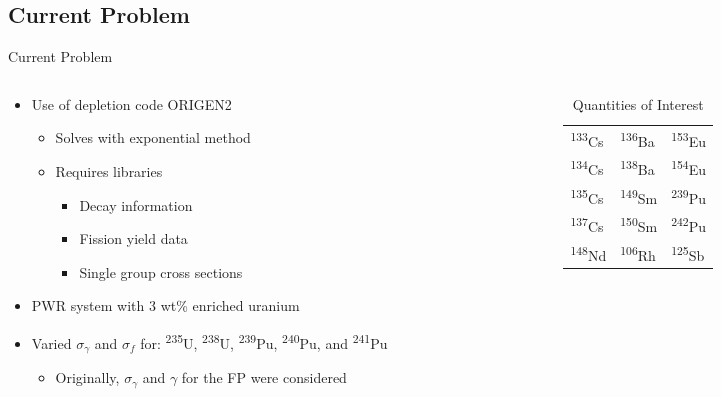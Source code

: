 \documentclass{beamer}
\newcommand{\tss}{\textsuperscript}
\begin{document}
\subsection{Current Problem}
\begin{frame}{Current Problem}
  \begin{columns}
    \begin{column}{0.6\textwidth}
      \begin{itemize}
      \item{Use of depletion code ORIGEN2}
        \begin{itemize}
        \item{Solves with exponential method}
        \item{Requires libraries}
          \begin{itemize}
          \item{Decay information}
          \item{Fission yield data}
          \item{Single group cross sections}
          \end{itemize}
        \end{itemize}
      \item{PWR system with 3 wt\% enriched uranium}
      \item{Varied $\sigma_\gamma$
        and $\sigma_f$ for: \tss{235}U, \tss{238}U,
        \tss{239}Pu, \tss{240}Pu, and \tss{241}Pu}
        \begin{itemize}
        \item{Originally, $\sigma_\gamma$ and $\gamma$ for
          the FP were considered}
        \end{itemize}
      \end{itemize}
    \end{column}
    \begin{column}{0.4\textwidth}
      \begin{table}[H]
        \begin{center}
          \caption{\large{Quantities of Interest}}
          \label{Table:1}
          \begin{tabular}{l l l}
            \toprule
            \tss{133}Cs & \tss{136}Ba & \tss{153}Eu\\
            \tss{134}Cs & \tss{138}Ba & \tss{154}Eu\\
            \tss{135}Cs & \tss{149}Sm & \tss{239}Pu\\
            \tss{137}Cs & \tss{150}Sm & \tss{242}Pu\\
            \tss{148}Nd & \tss{106}Rh & \tss{125}Sb\\
            \bottomrule
          \end{tabular}
        \end{center}
      \end{table}
    \end{column}
  \end{columns}  
\end{frame}
\end{document}
